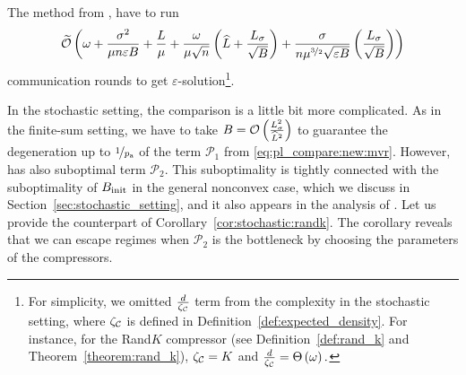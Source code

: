 \documentclass{article}
\newcommand{\algorithmname}{DARIA}
\newcommand*{\probavailable}{\ensuremath{p_{\textnormal{a}}}}
\begin{document}
The method  from \citep{tyurin2022dasha}, have to run
\begin{align}
  \label{eq:pl_compare:old:mvr}
  \widetilde{\mathcal{O}}\left(\omega + \frac{\sigma^2}{\mu n \varepsilon B} + \frac{L}{\mu} + \frac{\omega}{\mu \sqrt{n}} \left(\widehat{L} + \frac{L_{\sigma}}{\sqrt{B}}\right) + \frac{\sigma}{n \mu^{\nicefrac{3}{2}} \sqrt{\varepsilon B}}\left(\frac{L_{\sigma}}{\sqrt{B}}\right)\right)
\end{align}
communication rounds to get $\varepsilon$-solution\footnote{For simplicity, we omitted $\frac{d}{\zeta_{\mathcal{C}}}$ term from the complexity in the stochastic setting, where $\zeta_{\mathcal{C}}$ is defined in Definition~\ref{def:expected_density}. For instance, for the Rand$K$ compressor (see Definition~\ref{def:rand_k} and Theorem~\ref{theorem:rand_k}), $\zeta_{\mathcal{C}} = K$ and $\frac{d}{\zeta_{\mathcal{C}}} = \Theta\left(\omega\right).$}.

In the stochastic setting, the comparison is a little bit more complicated. As in the finite-sum setting, we have to take 
$B = \mathcal{O}\left(\frac{L_{\sigma}^2}{\widehat{L}^2}\right)$ to guarantee the degeneration up to $\nicefrac{1}{\probavailable}$ of the term $\mathcal{P}_1$ from \eqref{eq:pl_compare:new:mvr}. However, \algname{\algorithmname-MVR} has also suboptimal term $\mathcal{P}_2$. This suboptimality is tightly connected with the suboptimality of $B_{\textnormal{init}}$ in the general nonconvex case, which we discuss in Section~\ref{sec:stochastic_setting}, and it also appears in the analysis of  \citep{tyurin2022dasha}. Let us provide the counterpart of Corollary~\ref{cor:stochastic:randk}. The corollary reveals that we can escape regimes when $\mathcal{P}_2$ is the bottleneck by choosing the parameters of the compressors.
\end{document}
